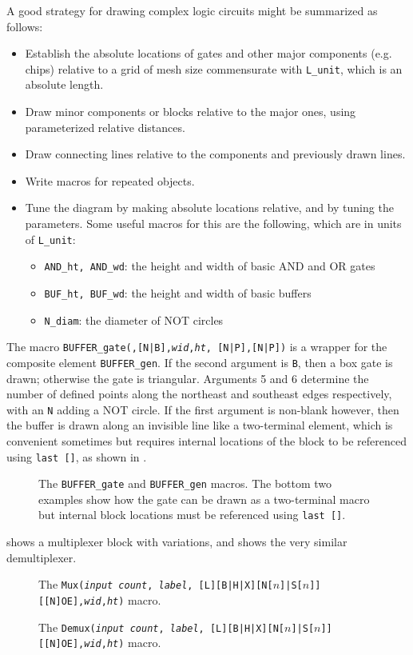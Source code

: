 A good strategy for drawing complex logic circuits might be summarized
as follows:
\begin{itemize}\itemsep=0pt
\item Establish the absolute locations of gates and other major components
  (e.g. chips) relative to a grid of mesh size commensurate with
  {\tt L\_unit}, which is an absolute length.
\item Draw minor components or blocks relative to the major ones, using
   parameterized relative distances.
\item Draw connecting lines relative to the components and previously drawn
   lines.
\item Write macros for repeated objects.
\item Tune the diagram by making absolute locations relative, and by tuning
   the parameters.
   Some useful macros for this are the following, which are in units of
  {\tt L\_unit}:
   \begin{itemize}
   \item[] {\tt AND\_ht, AND\_wd}: the height and width of basic AND and
     OR gates
   \item[] {\tt BUF\_ht, BUF\_wd}: the height and width of basic buffers
   \item[] {\tt N\_diam}: the diameter of NOT circles
   \end{itemize}
   \end{itemize}

The macro {\tt BUFFER\_gate(\linespec,[N|B],{\sl wid},{\sl ht},%
 [N|P],[N|P])}
is a wrapper for the composite element {\tt BUFFER\_gen}.
If the second argument is {\tt B}, then a box gate is drawn; otherwise
the gate is triangular.  Arguments 5 and 6 determine the number of defined
points along the northeast and southeast edges respectively, with an {\tt N}
adding a NOT circle.
If the first argument is non-blank however, then the buffer is drawn along
an invisible line like a two-terminal element, which is convenient sometimes
but requires internal locations of the block to be referenced using
{\tt last []}, as shown in .
\begin{figure}[h!t]
   
   \caption{The {\tt BUFFER\_gate} and {\tt BUFFER\_gen} macros.
     The bottom two examples show how the gate can be drawn as a two-terminal
     macro but internal block locations must be referenced using
     {\tt last []}.}
   \label{Buffer}
   \end{figure}

 shows a multiplexer block with variations, and
  shows
the very similar demultiplexer.
\begin{figure}[h!t]
   
   \caption{The {\tt Mux({\sl input count}, {\sl label}, 
      [L][B|H|X][N[$n$]|S[$n$]][[N]OE],{\sl wid},{\sl ht})} macro.}
   \label{Multiplexer}
   \end{figure}
\begin{figure}[h!t]
   
   \caption{The {\tt Demux({\sl input count}, {\sl label}, 
      [L][B|H|X][N[$n$]|S[$n$]][[N]OE],{\sl wid},{\sl ht})} macro.}
   \label{Demultiplexer}
   \end{figure}

